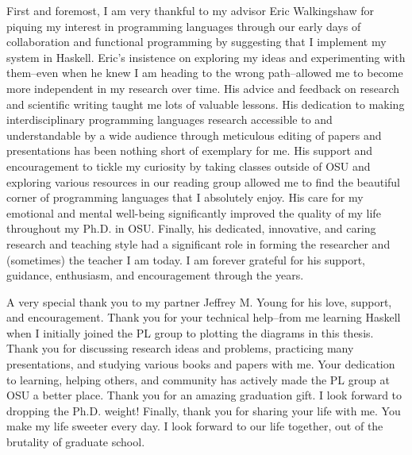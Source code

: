 First and foremost, I am very thankful to my advisor Eric Walkingshaw for 
piquing my interest in programming languages through our early days of collaboration
and functional programming by suggesting that I implement my system in Haskell.
%
Eric's insistence on exploring my ideas  and
experimenting with them--even when he knew I am heading 
to the wrong path--allowed me to become more independent in my research over time. 
%
His advice and feedback on research and scientific writing taught me lots of 
valuable lessons. His dedication 
to making interdisciplinary programming languages research accessible
to and understandable by a wide audience through meticulous editing of papers
and presentations has been nothing short of exemplary for me.
%
His support and encouragement to tickle my curiosity by taking classes outside of
OSU and exploring various resources in our reading group allowed me to find the beautiful corner
of programming languages that I absolutely enjoy.
%
His care for my emotional and mental well-being significantly improved the quality 
of my life throughout my Ph.D. in OSU. 
%
Finally, his dedicated, innovative, and caring research and teaching style 
had a significant role in forming the researcher and (sometimes) the teacher I am today. 
%
I am forever grateful for his support, guidance, enthusiasm, and encouragement through 
the years.

%
A very special thank you to my partner Jeffrey M. Young for his love, support, and encouragement. 
%
Thank you for your technical help--from me learning Haskell when I initially joined the PL group to plotting the diagrams in this thesis.
Thank you for discussing research ideas and problems,
practicing many presentations, and studying various books and papers with me. 
Your dedication to learning, helping others, and community has actively made the PL group at OSU a better place.
Thank you for an amazing graduation gift. I look forward to dropping the Ph.D. weight! 
Finally, thank you for sharing your life with me. You make my life sweeter every day.
I look forward to our life together, out of the brutality of graduate school. 


